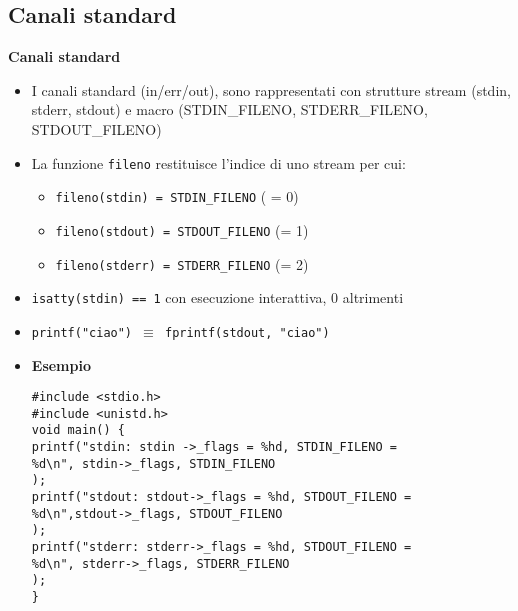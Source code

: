 \begin{flushleft}
  \subsection{Canali standard}
  \textbf{Canali standard}
  \begin{itemize}
    \item I canali standard (in/err/out), sono rappresentati con strutture stream (stdin, stderr, stdout) e macro 
          (STDIN\_FILENO, STDERR\_FILENO, STDOUT\_FILENO)
    \item La funzione \texttt{fileno} restituisce l'indice di uno stream per cui:
          \begin{itemize}
            \item \texttt{fileno(stdin) = STDIN\_FILENO} ( = 0)
            \item \texttt{fileno(stdout) = STDOUT\_FILENO} (= 1)
            \item \texttt{fileno(stderr) = STDERR\_FILENO} (= 2)
          \end{itemize}
    \item \texttt{isatty(stdin) == 1} con esecuzione interattiva, 0 altrimenti 
    \item \texttt{printf("ciao") $\equiv$ fprintf(stdout, "ciao")}
    \item \textbf{Esempio} \\
          \begin{flushleft}
            \texttt{\#include <stdio.h>\\
            \#include <unistd.h>\\
            void main() \{ \\
             \tab printf("stdin: stdin ->\_flags = \%hd, STDIN\_FILENO = \\
             \tab \halftab \%d\textbackslash n", stdin->\_flags, STDIN\_FILENO\\
             \tab ); \\
             \tab printf("stdout: stdout->\_flags = \%hd, STDOUT\_FILENO =\\
             \tab \halftab \%d\textbackslash n",stdout->\_flags, STDOUT\_FILENO \\
             \tab ); \\
             \tab printf("stderr: stderr->\_flags = \%hd, STDOUT\_FILENO = \\
             \tab \halftab \%d\textbackslash n", stderr->\_flags, STDERR\_FILENO\\
             \tab ); \\
             \} }
          \end{flushleft}
  \end{itemize}

\end{flushleft}
